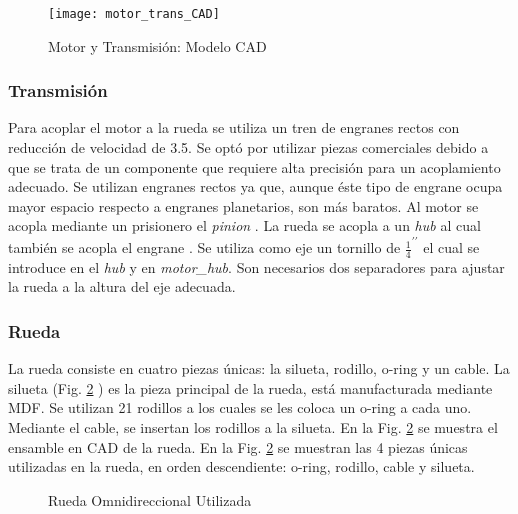 \begin{figure}
	\centering
		\texttt{[image: motor\_trans\_CAD]}
	\caption{Motor y Transmisión: Modelo CAD}
	\label{fig:mot_trans_cad}
\end{figure}


\subsubsection{Transmisión}
Para acoplar el motor a la rueda se utiliza un tren de engranes rectos con reducción de velocidad de 3.5. Se optó por utilizar piezas comerciales debido a que se trata de un componente que requiere alta precisión para un acoplamiento adecuado. Se utilizan engranes rectos ya que, aunque éste tipo de engrane ocupa mayor espacio respecto a engranes planetarios, son más baratos. Al motor se acopla mediante un prisionero el \textit{pinion} \cite{pinion}. La rueda se acopla a un \textit{hub} \cite{dual_ball_bearing} al cual también se acopla el engrane \cite{gear_motor}.  Se utiliza como eje un tornillo de $\frac{1}{4}^{\prime\prime}$ el cual se introduce en el \textit{hub} y en \textit{motor\_hub}. Son necesarios dos separadores para ajustar la rueda a la altura del eje adecuada.

\subsubsection{Rueda}
La rueda consiste en cuatro piezas únicas: la silueta, rodillo, o-ring \cite{o-rings} y un cable. La silueta  (Fig. \ref{fig:ruedaOmni} ) es la pieza principal de la rueda, está manufacturada mediante \gls{MDF}. Se utilizan 21 rodillos a los cuales se les coloca un o-ring a cada uno. Mediante el cable, se insertan los rodillos a la silueta.
En la Fig. \ref{fig:ruedaOmni}  se muestra el ensamble en CAD de la rueda. 
En la Fig. \ref{fig:ruedaOmni}  se muestran las 4 piezas únicas utilizadas en la rueda, en orden descendiente: o-ring, rodillo, cable y silueta.

\begin{figure}%
	\centering
		\qquad
		\qquad
		\qquad
	\caption{Rueda Omnidireccional Utilizada}
	\label{fig:ruedaOmni}%
\end{figure}

